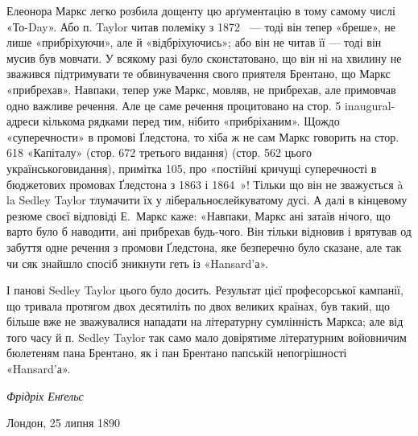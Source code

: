 Елеонора Маркс легко розбила дощенту цю арґументацію в тому самому числі «То-Day». Або п. Taylor
читав полеміку з 1872~ — тоді він тепер «бреше», не лише «прибріхуючи», але й «відбріхуючись»; або
він не читав її — тоді він мусив був
мовчати. У всякому разі було сконстатовано, що він ні на хвилину не зважився підтримувати те
обвинувачення свого приятеля Брентано, що Маркс «прибрехав». Навпаки, тепер уже Маркс, мовляв, не
прибрехав, але примовчав одно важливе речення. Але це саме речення процитовано на стор. 5
inaugural-адреси кількома рядками перед тим, нібито «прибріханим». Щождо «суперечности» в промові
Ґледстона, то хіба ж не сам Маркс говорить на стор. 618 «Капіталу» (стор. 672 третього видання)
(стор. 562 цього українськоговидання), примітка 105, про «постійні кричущі суперечності в бюджетових
промовах Ґледстона з 1863 і 1864~»! Тільки що
він не зважується à la Sedley Taylor тлумачити їх у ліберальноєлейкуватому
дусі. А далі в кінцевому резюме своєї відповіді Е.~Маркс каже: «Навпаки, Маркс ані затаїв нічого, що
варто
було б наводити, ані прибрехав будь-чого. Він тільки відновив
і врятував од забуття одне речення з промови Ґледстона, яке безперечно
було сказане, але так чи сяк знайшло спосіб зникнути
геть із «Hansard’а».

І панові Sedley Taylor цього було досить. Результат цієї професорської
кампанії, що тривала протягом двох десятиліть
по двох великих країнах, був такий, що більше вже не зважувалися
нападати на літературну сумлінність Маркса; але від
того часу й п. Sedley Taylor так само мало довірятиме літературним
войовничим бюлетеням пана Брентано, як і пан Брентано
папській непогрішності «Hansard’а».

\begin{flushright}
\emph{Фрідріх Енґельс}
\end{flushright}

{\small Лондон, 25 липня 1890~}
